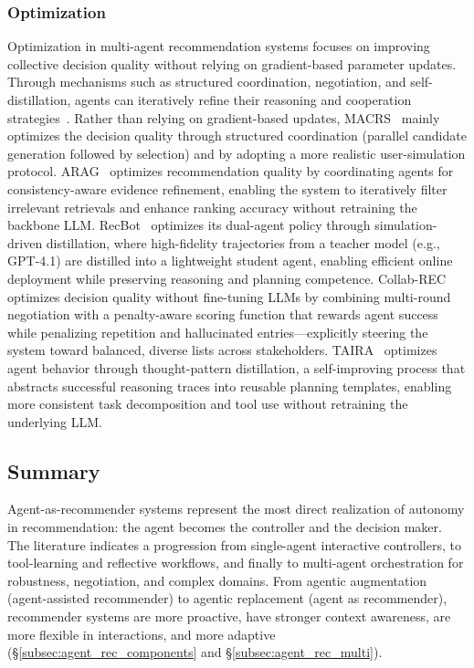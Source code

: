 \subsubsection{\textbf{Optimization}}\label{subsubsec:multi-agent-optimization}
Optimization in multi-agent recommendation systems focuses on improving collective decision quality without relying on gradient-based parameter updates.
Through mechanisms such as structured coordination, negotiation, and self-distillation, agents can iteratively refine their reasoning and cooperation strategies~\cite{acharya2026group, li2026recnet, wu2026internalizing, wang2026self, wang2026momorec, zhu2025llm_based_conv}.
Rather than relying on gradient-based updates, MACRS~\cite{fang2024multi} mainly optimizes the decision quality through structured coordination (parallel candidate generation followed by selection) and by adopting a more realistic user-simulation protocol.
ARAG~\cite{maragheh2025arag} optimizes recommendation quality by coordinating agents for consistency-aware evidence refinement, enabling the system to iteratively filter irrelevant retrievals and enhance ranking accuracy without retraining the backbone LLM.
RecBot~\cite{tang2025interactive} optimizes its dual-agent policy through simulation-driven distillation, where high-fidelity trajectories from a teacher model (e.g., GPT-4.1) are distilled into a lightweight student agent, enabling efficient online deployment while preserving reasoning and planning competence.
Collab-REC~\cite{banerjee2025collab} optimizes decision quality without fine-tuning LLMs by combining multi-round negotiation with a penalty-aware scoring function that rewards agent success while penalizing repetition and hallucinated entries—explicitly steering the system toward balanced, diverse lists across stakeholders.
TAIRA~\cite{yu2025thought} optimizes agent behavior through thought-pattern distillation, a self-improving process that abstracts successful reasoning traces into reusable planning templates, enabling more consistent task decomposition and tool use without retraining the underlying LLM.



\subsection{Summary}\label{subsec:agent_rec_summary}

Agent-as-recommender systems represent the most direct realization of autonomy in recommendation: the agent becomes the controller and the decision maker. The literature indicates a progression from single-agent interactive controllers, to tool-learning and reflective workflows, and finally to multi-agent orchestration for robustness, negotiation, and complex domains. 
From agentic augmentation (\ie agent-assisted recommender) to agentic replacement (\ie agent as recommender), recommender systems are more proactive, have stronger context awareness, are more flexible in interactions, and more adaptive (\cf \S \ref{subsec:agent_rec_components} and \S \ref{subsec:agent_rec_multi}).
